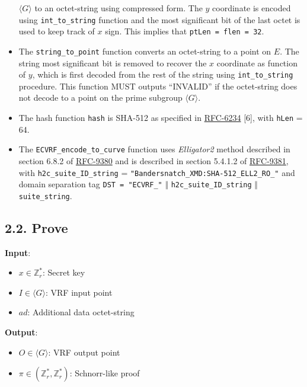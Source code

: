 \documentclass[
]{article}
\providecommand{\tightlist}{%
  \setlength{\itemsep}{0pt}\setlength{\parskip}{0pt}}
\begin{document}
\begin{itemize}
  \(\langle G \rangle\) to an octet-string using compressed form. The
  \(y\) coordinate is encoded using \texttt{int\_to\_string} function
  and the most significant bit of the last octet is used to keep track
  of \(x\) sign. This implies that \texttt{ptLen\ =\ flen\ =\ 32}.
\item
  The \texttt{string\_to\_point} function converts an octet-string to a
  point on \(E\). The string most significant bit is removed to recover
  the \(x\) coordinate as function of \(y\), which is first decoded from
  the rest of the string using \texttt{int\_to\_string} procedure. This
  function MUST outputs ``INVALID'' if the octet-string does not decode
  to a point on the prime subgroup \(\langle G \rangle\).
\item
  The hash function \texttt{hash} is SHA-512 as specified in
  \href{https://datatracker.ietf.org/doc/rfc6234}{RFC-6234} {[}6{]},
  with \texttt{hLen} = 64.
\item
  The \texttt{ECVRF\_encode\_to\_curve} function uses \emph{Elligator2}
  method described in section 6.8.2 of
  \href{https://datatracker.ietf.org/doc/rfc9380}{RFC-9380} and is
  described in section 5.4.1.2 of
  \href{https://datatracker.ietf.org/doc/rfc9381}{RFC-9381}, with
  \texttt{h2c\_suite\_ID\_string} =
  \texttt{"Bandersnatch\_XMD:SHA-512\_ELL2\_RO\_"} and domain separation
  tag \texttt{DST\ =\ "ECVRF\_"} \(\Vert\)
  \texttt{h2c\_suite\_ID\_string} \(\Vert\) \texttt{suite\_string}.
\end{itemize}

\hypertarget{prove}{%
\subsection{2.2. Prove}\label{prove}}

\textbf{Input}:

\begin{itemize}
\tightlist
\item
  \(x \in \mathbb{Z}^*_r\): Secret key
\item
  \(I \in \langle G \rangle\): VRF input point
\item
  \(ad\): Additional data octet-string
\end{itemize}

\textbf{Output}:

\begin{itemize}
\tightlist
\item
  \(O \in \langle G \rangle\): VRF output point
\item
  \(\pi \in (\mathbb{Z}^*_r, \mathbb{Z}^*_r)\): Schnorr-like proof
\end{itemize}
\end{document}
